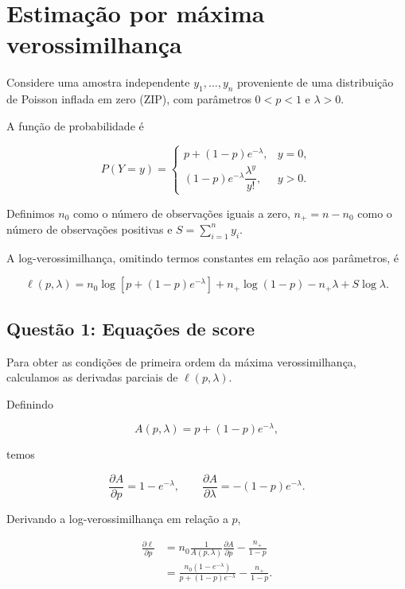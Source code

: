 
\section{Estimação por máxima verossimilhança}

Considere uma amostra independente
$y_1,\ldots,y_n$ proveniente de uma distribuição
de Poisson inflada em zero (ZIP), com parâmetros
$0<p<1$ e $\lambda>0$.

A função de probabilidade é

\begin{equation}
P(Y=y)=
\begin{cases}
p+(1-p)e^{-\lambda}, & y=0,\\
(1-p)e^{-\lambda}\dfrac{\lambda^y}{y!},
& y>0.
\end{cases}
\end{equation}

Definimos $n_0$ como o número de observações iguais
a zero, $n_+=n-n_0$ como o número de observações
positivas e $S=\sum_{i=1}^{n}y_i$.

A log-verossimilhança, omitindo termos constantes
em relação aos parâmetros, é

\begin{equation}
\ell(p,\lambda)
=
n_0\log\left[p+(1-p)e^{-\lambda}\right]
+n_+\log(1-p)
-n_+\lambda
+S\log\lambda.
\end{equation}

\subsection{Questão 1: Equações de score}

Para obter as condições de primeira ordem da
máxima verossimilhança, calculamos as derivadas
parciais de $\ell(p,\lambda)$.

Definindo

\begin{equation}
A(p,\lambda)=p+(1-p)e^{-\lambda},
\end{equation}

temos

\begin{equation}
\frac{\partial A}{\partial p}
=1-e^{-\lambda},
\qquad
\frac{\partial A}{\partial\lambda}
=-(1-p)e^{-\lambda}.
\end{equation}

Derivando a log-verossimilhança em relação a $p$,

\begin{align}
\frac{\partial\ell}{\partial p}
&=
n_0\frac{1}{A(p,\lambda)}
\frac{\partial A}{\partial p}
-\frac{n_+}{1-p}\\
&=
\frac{n_0(1-e^{-\lambda})}
{p+(1-p)e^{-\lambda}}
-\frac{n_+}{1-p}.
\end{align}

